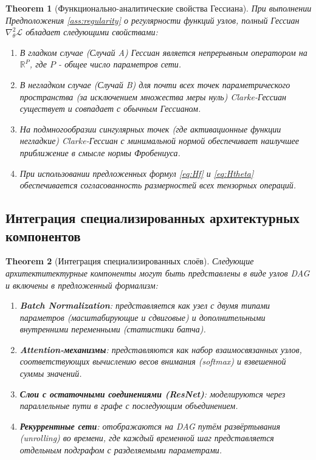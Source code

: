 \documentclass[11pt]{article}
\newtheorem{theorem}{Theorem}
\begin{document}
\begin{theorem}[Функционально-аналитические свойства Гессиана]
  При выполнении Предположения \ref{ass:regularity} о регулярности функций узлов, полный Гессиан
  $\nabla^2_\theta \mathcal{L}$ обладает следующими свойствами:
  \begin{enumerate}
    \item В гладком случае (Случай A) Гессиан является непрерывным оператором на $\mathbb{R}^P$, где $P$ -
      общее число параметров сети.
    \item В негладком случае (Случай B) для почти всех точек параметрического пространства (за исключением
      множества меры нуль) Clarke-Гессиан существует и совпадает с обычным Гессианом.
    \item На подмногообразии сингулярных точек (где активационные функции негладкие) Clarke-Гессиан с
      минимальной нормой обеспечивает наилучшее приближение в смысле нормы Фробениуса.
    \item При использовании предложенных формул \eqref{eq:Hf} и \eqref{eq:Htheta} обеспечивается
      согласованность размерностей всех тензорных операций.
  \end{enumerate}
\end{theorem}

\subsection{Интеграция специализированных архитектурных компонентов}

\begin{theorem}[Интеграция специализированных слоёв]
  Следующие архитектитектурные компоненты могут быть представлены в виде узлов DAG и включены в предложенный формализм:
  \begin{enumerate}
    \item \textbf{Batch Normalization}: представляется как узел с двумя типами параметров (масштабирующие и
      сдвиговые) и дополнительными внутренними переменными (статистики батча).
    \item \textbf{Attention-механизмы}: представляются как набор взаимосвязанных узлов, соответствующих
      вычислению весов внимания (softmax) и взвешенной суммы значений.
    \item \textbf{Слои с остаточными соединениями (ResNet)}: моделируются через параллельные пути в графе с
      последующим объединением.
    \item \textbf{Рекуррентные сети}: отображаются на DAG путём развёртывания (unrolling) во времени, где
      каждый временной шаг представляется отдельным подграфом с разделяемыми параметрами.
  \end{enumerate}
\end{theorem}
\end{document}
